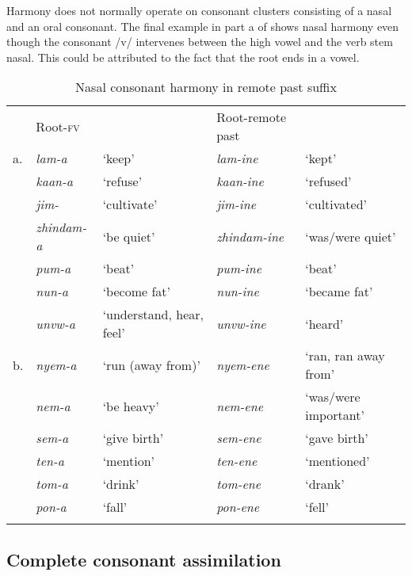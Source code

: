 \documentclass[output=paper]{langsci/langscibook}
\begin{document}
 
Harmony does not normally operate on consonant clusters consisting of a nasal and an oral consonant. The final example in part a of  shows nasal harmony even though the consonant /v/ intervenes between the high vowel and the verb stem nasal. This could be attributed to the fact that the root ends in a vowel. 


\begin{table}
\begin{tabular}{lllll}
\lsptoprule
 & Root-\textsc{fv} &  & Root-remote past & \\
a. & \textit{lam-a} & `keep' & \textit{lam-ine} & `kept' \\
 & \textit{kaan-a} & `refuse' & \textit{kaan-ine} & `refused' \\
 & \textit{jim-} & `cultivate' & \textit{jim-ine} & `cultivated' \\
 & \textit{zhindam-a} & `be quiet' & \textit{zhindam-ine} & `was/were quiet' \\
 & \textit{pum-a} & `beat' & \textit{pum-ine} & `beat' \\
 & \textit{nun-a} & `become fat' & \textit{nun-ine} & `became fat' \\
 & \textit{unvw-a} & `understand, hear, feel' & \textit{unvw-ine} & `heard' \\

b. & \textit{nyem-a} & `run (away from)' & \textit{nyem-ene} & `ran, ran away from' \\
 & \textit{nem-a} & `be heavy' & \textit{nem-ene} & `was/were important' \\
 & \textit{sem-a} & `give birth' & \textit{sem-ene} & `gave birth' \\
 & \textit{ten-a} & `mention' & \textit{ten-ene} & `mentioned' \\
 & \textit{tom-a} & `drink' & \textit{tom-ene} & `drank' \\
 & \textit{pon-a} & `fall' & \textit{pon-ene} & `fell' \\

\lspbottomrule
\end{tabular}

\caption{Nasal consonant harmony in remote past suffix}
\label{tab:4.kawasha}

\end{table}

\subsection{Complete consonant assimilation}
\end{document}
